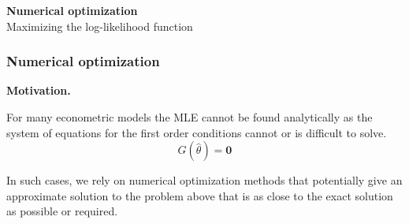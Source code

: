\documentclass[notes,blackandwhite,mathsans]{beamer}
\begin{document}
%
%
%





{
\begin{frame}

\begin{adjustwidth}{-0.5cm}{0cm}
\vspace{7.3cm}\Large
\textbf{{\color{mcxs1}Numerical optimization}}\\ 
{\color{mcxs5}Maximizing the log-likelihood function}
\end{adjustwidth}

\end{frame}
}




\begin{frame}
\frametitle{Numerical optimization}

\textbf{Motivation.}

{\color{mcxs2}For many econometric models the MLE cannot be found analytically as the system of equations for the first order conditions cannot or is difficult to solve.}
$$ G\left(\hat\theta\right) = \mathbf{0} $$

{\color{mcxs2}In such cases, we rely on numerical optimization methods that potentially give an approximate solution to the problem above that is as close to the exact solution as possible or required.}

\end{frame}
\end{document}
